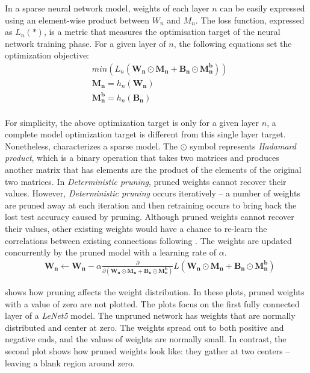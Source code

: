 \documentclass[a4paper,12pt]{report}
\begin{document}
In a sparse neural network model, weights of each layer $n$ can be easily
expressed using an element-wise product between $W_n$ and $M_n$.
The loss function, expressed as $L_n(*)$, is a metric that measures the optimisation
target of the neural network training phase.
For a given layer of $n$, the following equations set the optimization
objective:
\begin{equation}
  \begin{aligned}
    & min(L_n(\mathbf{W_n} \odot \mathbf{M_n} + \mathbf{B_n} \odot \mathbf{M^b_n})) \\
    & \mathbf{M_n} = h_n(\mathbf{W_n}) \\
    & \mathbf{M^{b}_n} = h_n(\mathbf{B_n}) \\
  \end{aligned}
  \label{equ:minfunc}
\end{equation}

For simplicity, the above optimization target is only for a given layer $n$,
a complete model optimization target is different from this single layer target.
Nonetheless,  characterizes a sparse model.
The $\odot$ symbol represents \textit{Hadamard product}, which is a binary operation
that takes two matrices and produces another matrix that has elements are the
product of the elements of the original two matrices.
In \textit{Deterministic pruning}, pruned weights cannot recover their values.
However, \textit{Deterministic pruning} occurs iteratively -- a number of weights are pruned
away at each iteration and then retraining occurs to bring back the lost test accuracy caused by pruning.
Although pruned weights cannot recover their values, other
existing weights would have a chance to re-learn the correlations between existing
connections following  \cite{Guo}.
The weights are updated concurrently by the pruned
model with a learning rate of $\alpha$.
\begin{equation}
  \begin{aligned}
    & \mathbf{W_n} \leftarrow \mathbf{W_n} - \alpha \frac{\partial}{\partial(\mathbf{W_n} \odot \mathbf{M_n} + \mathbf{B_n} \odot \mathbf{M^b_n})} L(\mathbf{W_n} \odot \mathbf{M_n} + \mathbf{B_n} \odot \mathbf{M^b_n})
  \end{aligned}
  \label{equ:trainfunc}
\end{equation}


 shows how pruning affects the weight distribution.
In these plots, pruned weights with a value of zero are not plotted.
The plots focus on the first fully connected layer of a \textit{LeNet5} model.
The unpruned network has weights that are normally distributed and
center at zero.
The weights spread out to both positive and negative ends, and the values of
weights are normally small.
In contrast, the second plot shows how pruned weights look like: they gather
at two centers -- leaving a blank region around zero.
\end{document}
